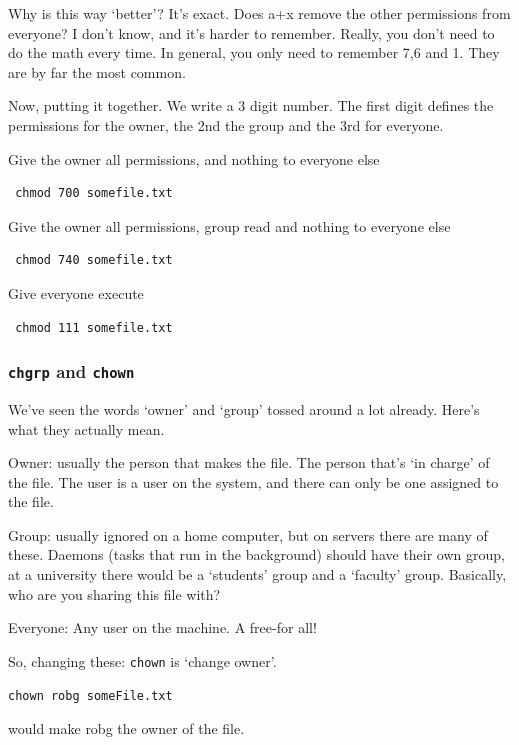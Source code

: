 Why is this way `better'? It's exact. Does a+x remove the other permissions from everyone? I don't know,
and it's harder to remember. Really, you don't need to do the math every time. In general, you only 
need to remember 7,6 and 1. They are by far the most common.

Now, putting it together. We write a 3 digit number. The first digit defines the 
permissions for the owner, the 2nd the group and the 3rd for everyone.

Give the owner all permissions, and nothing to everyone else
\begin{verbatim} chmod 700 somefile.txt \end{verbatim}
	

Give the owner all permissions, group read and nothing to everyone else
\begin{verbatim} chmod 740 somefile.txt \end{verbatim}	

Give everyone execute
\begin{verbatim} chmod 111 somefile.txt \end{verbatim}	

\subsubsection{{\tt chgrp} and {\tt chown}}
We've seen the words `owner' and `group' tossed around a lot already. Here's what they 
actually mean.

Owner: usually the person that makes the file. The person that's `in charge' of the file. The user
is a user on the system, and there can only be one assigned to the file.

Group: usually ignored on a home computer, but on servers there are many of these. Daemons (tasks that run
in the background) should have their own group, at a university there would be a `students' group and a `faculty' group. 
Basically, who are you sharing this file with?

Everyone: Any user on the machine. A free-for all!

So, changing these: {\tt chown} is `change owner'. 
\begin{verbatim}chown robg someFile.txt \end{verbatim}
would make robg the owner of the file.

